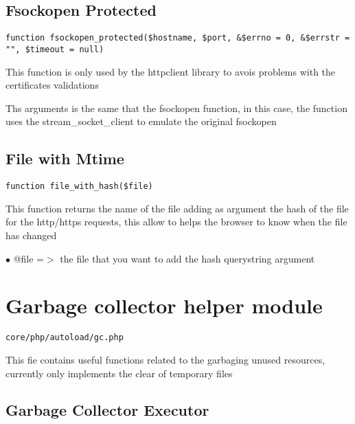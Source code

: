 \documentclass[a4paper]{book}
\begin{document}
\hypertarget{toc132}{}
\subsection{Fsockopen Protected}

\begin{lstlisting}
function fsockopen_protected($hostname, $port, &$errno = 0, &$errstr = "", $timeout = null)
\end{lstlisting}

This function is only used by the httpclient library to avois problems with
the certificates validations

Ths arguments is the same that the fsockopen function, in this case, the
function uses the stream\_socket\_client to emulate the original fsockopen

\hypertarget{toc133}{}
\subsection{File with Mtime}

\begin{lstlisting}
function file_with_hash($file)
\end{lstlisting}

This function returns the name of the file adding as argument the hash
of the file for the http/https requests, this allow to helps the browser
to know when the file has changed

\begin{compactitem}
\item[\color{myblue}$\bullet$] @file =$>$ the file that you want to add the hash querystring argument
\end{compactitem}

\hypertarget{toc134}{}
\section{Garbage collector helper module}

\begin{lstlisting}
core/php/autoload/gc.php
\end{lstlisting}

This fie contains useful functions related to the garbaging unused resources, currently only
implements the clear of temporary files

\hypertarget{toc135}{}
\subsection{Garbage Collector Executor}
\end{document}
